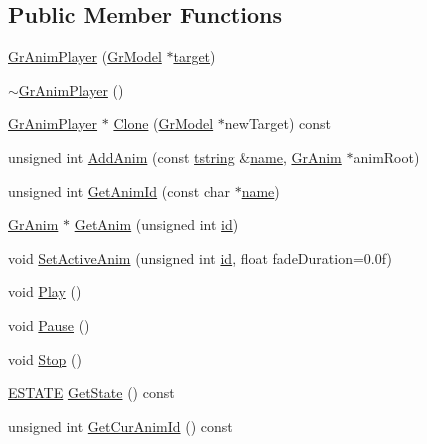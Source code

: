 \begin{CompactItemize}
\subsection*{Public Member Functions}
\begin{CompactItemize}
\item 
\hyperlink{class_gr_anim_player_7b279986945feaa0ff25878fc5f16c78}{GrAnimPlayer} (\hyperlink{class_gr_model}{GrModel} $\ast$\hyperlink{glext_8h_f9d0cbbbeb7414e786c41899e5a856d7}{target})
\item 
\hyperlink{class_gr_anim_player_86fd4d9f14bdc935bc704d3ec4b069d1}{$\sim$GrAnimPlayer} ()
\item 
\hyperlink{class_gr_anim_player}{GrAnimPlayer} $\ast$ \hyperlink{class_gr_anim_player_6e2dfd70dbaf0a5040f2083c1a0ba6c9}{Clone} (\hyperlink{class_gr_model}{GrModel} $\ast$newTarget) const 
\item 
unsigned int \hyperlink{class_gr_anim_player_1207033fa4b66842478bd2d7d30c7925}{AddAnim} (const \hyperlink{common__afx_8h_816fa58fd77499b0edb2c69ebe803d5c}{tstring} \&\hyperlink{glext__bak_8h_bb62efe59ccdd153ce42e1a418352209}{name}, \hyperlink{class_gr_anim}{GrAnim} $\ast$animRoot)
\item 
unsigned int \hyperlink{class_gr_anim_player_7fc95790506d45f32efbcb9023606318}{GetAnimId} (const char $\ast$\hyperlink{glext__bak_8h_bb62efe59ccdd153ce42e1a418352209}{name})
\item 
\hyperlink{class_gr_anim}{GrAnim} $\ast$ \hyperlink{class_gr_anim_player_ced4497db4ff6a6b449c12229287a830}{GetAnim} (unsigned int \hyperlink{glext__bak_8h_58c2a664503e14ffb8f21012aabff3e9}{id})
\item 
void \hyperlink{class_gr_anim_player_20592a82ff4bd496988566edd6151c61}{SetActiveAnim} (unsigned int \hyperlink{glext__bak_8h_58c2a664503e14ffb8f21012aabff3e9}{id}, float fadeDuration=0.0f)
\item 
void \hyperlink{class_gr_anim_player_8ffa920aacb2bc0682c0b842e7c913a8}{Play} ()
\item 
void \hyperlink{class_gr_anim_player_6a6da2d52a5f33215eaf6885b19cc8a7}{Pause} ()
\item 
void \hyperlink{class_gr_anim_player_a4866f3c51e25c346b0eec2d5acdd0dc}{Stop} ()
\item 
\hyperlink{class_gr_anim_player_b3c2ba6a58db17d254f4591ac28a0a75}{ESTATE} \hyperlink{class_gr_anim_player_bf5ea7dcbe01ab3f7a8e8ffc22632c19}{GetState} () const 
\item 
unsigned int \hyperlink{class_gr_anim_player_1c07ae13f8f25a0e5f04b80cfc74cd25}{GetCurAnimId} () const 

\end{CompactItemize}
\end{CompactItemize}
